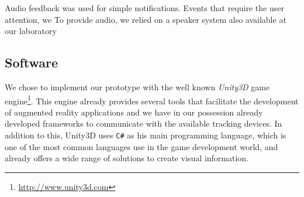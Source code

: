 Audio feedback was used for simple notifications. Events that require the user attention, we
To provide audio, we relied on a speaker system also available at our laboratory

\subsection{Software}

We chose to implement our prototype with the well known \emph{Unity3D} game engine\footnote{\url{http://www.unity3d.com}}.
This engine already provides several tools that facilitate the development of augmented reality applications and we have in our possession already developed frameworks to communicate with the available tracking devices. In addition to this, Unity3D uses \texttt{C\#} as his main programming language, which is one of the most common languages use in the game development world, and already offers a wide range of solutions to create visual information.


